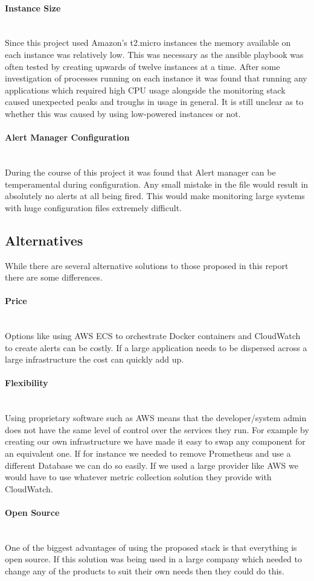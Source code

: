 \paragraph{Instance Size}\mbox{}\\
Since this project used Amazon's t2.micro instances the memory available on each instance was relatively low. This was necessary as the ansible playbook was often tested by creating upwards of twelve instances at a time. After some investigation of processes running on each instance it was found that running any applications which required high CPU usage alongside the monitoring stack caused unexpected peaks and troughs in usage in general. It is still unclear as to whether this was caused by using low-powered instances or not.

\paragraph{Alert Manager Configuration}\mbox{}\\
During the course of this project it was found that Alert manager can be temperamental during configuration. Any small mistake in the file would result in absolutely no alerts at all being fired. This would make monitoring large systems with huge configuration files extremely difficult. 

\subsection{Alternatives}
While there are several alternative solutions to those proposed in this report there are some differences.

\paragraph{Price}\mbox{}\\
Options like using AWS ECS to orchestrate Docker containers and CloudWatch to create alerts can be costly. If a large application needs to be dispersed across a large infrastructure the cost can quickly add up. 

\paragraph{Flexibility}\mbox{}\\
Using proprietary software such as AWS means that the developer/system admin does not have the same level of control over the services they run. For example by creating our own infrastructure we have made it easy to swap any component for an equivalent one. If for instance we needed to remove Prometheus and use a different Database we can do so easily. If we used a large provider like AWS we would have to use whatever metric collection solution they provide with CloudWatch.

\paragraph{Open Source}\mbox{}\\
One of the biggest advantages of using the proposed stack is that everything is open source. If this solution was being used in a large company which needed to change any of the products to suit their own needs then they could do this.
